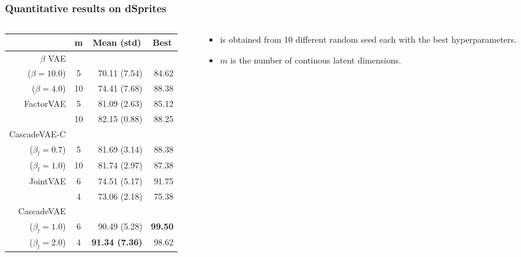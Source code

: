 \documentclass[10pt,mathserif]{beamer}
\begin{document}
\begin{frame}
\frametitle{Quantitative results on dSprites}
\begin{columns}
\begin{column}{0.5\textwidth}
\begin{table}[htbp]
\centering
\fontsize{9pt}{9.5pt}\selectfont
\begin{tabular}{rc rr}
\addlinespace[-\aboverulesep]
\toprule
\multicolumn{1}{c}{Method}&m&\multicolumn{1}{c}{Mean (std)}&\multicolumn{1}{c}{Best}\\
\toprule
$\beta$ VAE\\($\beta=10.0$)& 5 & 70.11 (7.54)&84.62\\
($\beta=4.0$)& 10 &74.41 (7.68)&88.38\\
\midrule
FactorVAE& 5  &81.09 (2.63)&85.12\\
        & 10 &82.15 (0.88)&88.25\\
\midrule
CascadeVAE-C\\($\beta_l=0.7$)& 5  &81.69 (3.14)&88.38\\
    ($\beta_l=1.0$)& 10 &81.74 (2.97)&87.38\\
\midrule
\midrule
JointVAE & 6 &  74.51 (5.17)&91.75\\
        & 4 &  73.06 (2.18)&75.38\\
\midrule
CascadeVAE\\($\beta_l=1.0$)& 6 &90.49 (5.28)&\textbf{99.50}\\
($\beta_l=2.0$)& 4 &\textbf{91.34 (7.36)}&98.62\\
\bottomrule
\end{tabular}
\end{table}
\end{column}
\begin{column}{0.35\textwidth}
\begin{itemize}\itemsep=12pt
\item {\color{blue}{Disentanglement score}} is obtained from 10 different random seed each with the best hyperparameters. 
\item $m$ is the number of continous latent dimensions.
\end{itemize}
\end{column}
\end{columns}
\end{frame}
\end{document}
